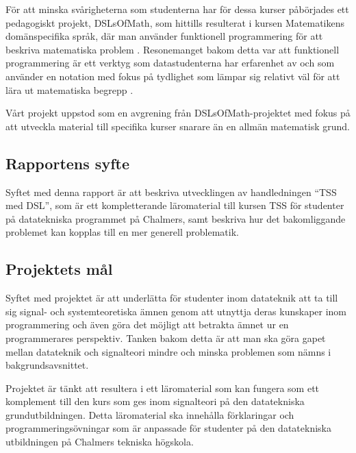 \documentclass[]{article}
\begin{document}
För att minska svårigheterna som studenterna har för dessa kurser påbörjades
ett pedagogiskt projekt, DSLsOfMath, som hittills resulterat i kursen
Matematikens domänspecifika språk, där man använder funktionell
programmering för att beskriva matematiska problem \cite{kursplan:dslsofmath}.
Resonemanget bakom detta var att funktionell programmering är ett verktyg
som datastudenterna har erfarenhet av och som använder en notation med
fokus på tydlighet som lämpar sig relativt väl för att lära ut matematiska
begrepp \cite{TFPIE15_DSLsofMath_IonescuJansson}.

Vårt projekt uppstod som en avgrening från DSLsOfMath-projektet med fokus på
att utveckla material till specifika kurser snarare än en allmän matematisk
grund.

\subsection{Rapportens syfte}


Syftet med denna rapport är att beskriva utvecklingen av handledningen
``TSS med DSL'', som är ett kompletterande läromaterial till kursen TSS
för studenter på datatekniska programmet på Chalmers,
samt beskriva hur det bakomliggande problemet kan kopplas till en mer
generell problematik.

\subsection{Projektets mål}
Syftet med projektet är att underlätta för studenter inom datateknik att
ta till sig signal- och systemteoretiska ämnen genom att utnyttja deras
kunskaper inom programmering och även göra det möjligt att betrakta ämnet ur
en programmerares perspektiv. Tanken bakom detta är att man ska göra gapet
mellan datateknik och signalteori mindre och minska problemen som nämns
i bakgrundsavsnittet.

Projektet är tänkt att resultera i ett läromaterial som kan fungera som ett
komplement till den kurs som ges inom signalteori på den datatekniska
grundutbildningen. Detta läromaterial ska innehålla förklaringar och
programmeringsövningar som är anpassade för studenter på den datatekniska
utbildningen på Chalmers tekniska högskola.
\end{document}
